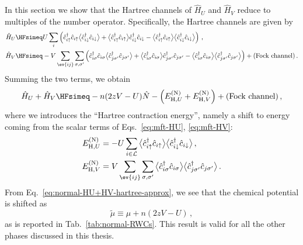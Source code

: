In this section we show that the Hartree channels of $\hat H_U$ and $\hat H_V$ reduce to multiples of the number operator. Specifically, the Hartree channels are given by
\[
\begin{aligned}
	\hat H_U &\HFsimeq U \sum_i \left(
		\hat c_{i\uparrow}^\dagger \hat c_{i\uparrow} \big\langle \hat c_{i\downarrow}^\dagger \hat c_{i\downarrow} \big\rangle + \big\langle \hat c_{i\uparrow}^\dagger \hat c_{i\uparrow} \big\rangle \hat c_{i\downarrow}^\dagger \hat c_{i\downarrow} - \big\langle \hat c_{i\uparrow}^\dagger \hat c_{i\uparrow} \big\rangle  \big\langle \hat c_{i\downarrow}^\dagger \hat c_{i\downarrow} \big\rangle 
	\right) \, , \\
	\hat H_V &\HFsimeq -V \sum_{\ev{ij}} \sum_{\sigma,\sigma'} \left(
		\hat c_{i\sigma}^\dagger \hat c_{i\sigma} \big\langle \hat c_{j\sigma'}^\dagger \hat c_{j\sigma'} \big\rangle + \big\langle \hat c_{i\sigma}^\dagger \hat c_{i\sigma} \big\rangle \hat c_{j\sigma'}^\dagger \hat c_{j\sigma'} - \big\langle \hat c_{i\sigma}^\dagger \hat c_{i\sigma} \big\rangle  \big\langle \hat c_{j\sigma'}^\dagger \hat c_{j\sigma'} \big\rangle
	\right) + (\text{Fock channel}) \, .
\end{aligned}
\]
Summing the two terms, we obtain
\begin{equation}\label{eq:normal-HU+HV-hartree-approx}
	\hat H_U + \hat H_V \HFsimeq -n(2zV-U) \hat N - \left(E_{\mathrm{H},U}^{(\mathrm{N})} + E_{\mathrm{H},V}^{(\mathrm{N})}\right) + (\text{Fock channel}) \, ,
\end{equation}
where we introduces the ``Hartree contraction energy'', namely a shift to energy coming from the scalar terms of Eqs.~\eqref{eq:mft-HU}, \eqref{eq:mft-HV}:
\begin{align}
	E_{\mathrm{H},U}^{(\mathrm{N})} &= - U \sum_{i \in\mathcal{L}} \big\langle \hat c_{i\uparrow}^\dagger \hat c_{i\uparrow} \big\rangle  \big\langle \hat c_{i\downarrow}^\dagger \hat c_{i\downarrow} \big\rangle \, , \label{eq:normal-HU-hartree-Ec-implicit} \\
	E_{\mathrm{H},V}^{(\mathrm{N})} &= V \sum_{\ev{ij}} \sum_{\sigma,\sigma'} \big\langle \hat c_{i\sigma}^\dagger \hat c_{i\sigma} \big\rangle  \big\langle \hat c_{j\sigma'}^\dagger \hat c_{j\sigma'} \big\rangle \, . \label{eq:normal-HV-hartree-Ec-implicit}
\end{align}
From Eq.~\eqref{eq:normal-HU+HV-hartree-approx}, we see that the chemical potential is shifted as
\begin{equation}\label{eq:normal-mu-shift}
	\tilde{\mu} \equiv \mu + n(2zV-U) \, ,
\end{equation}
as is reported in Tab.~\ref{tab:normal-RWCs}. This result is valid for all the other phases discussed in this thesis.

